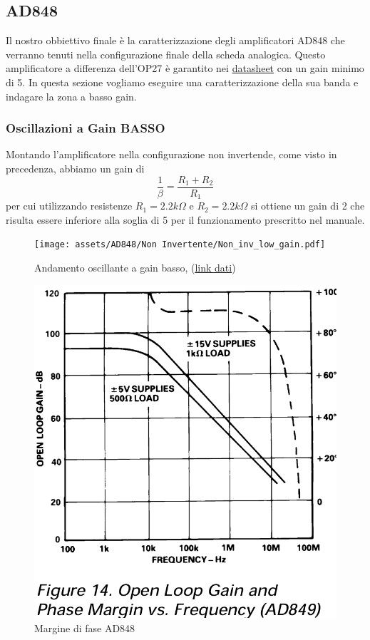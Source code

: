 \subsection{AD848}

Il nostro obbiettivo finale è la caratterizzazione degli amplificatori AD848 che verranno tenuti nella configurazione finale della scheda analogica.
Questo amplificatore a differenza dell'OP27 è garantito nei \href{https://www.analog.com/media/en/technical-documentation/data-sheets/AD848.pdf}{datasheet} con un gain minimo di 5. In questa sezione vogliamo eseguire una caratterizzazione della sua banda e indagare la zona a basso gain.

\subsubsection{Oscillazioni a Gain BASSO}

Montando l'amplificatore nella configurazione non invertende, come visto in precedenza, abbiamo un gain di $$\frac{1}{\beta} = \frac{R_1+R_2}{R_1}$$ per cui utilizzando resistenze $R_1 = 2.2k\Omega$ e $R_2 = 2.2k\Omega$ si ottiene un gain di 2 che risulta essere inferiore alla soglia di 5 per il funzionamento prescritto nel manuale.

\begin{figure}[!h]
    \begin{minipage}{.5\linewidth}
        \centering
        \texttt{[image: assets/AD848/Non Invertente/Non\_inv\_low\_gain.pdf]}
        \caption{Andamento oscillante a gain basso, (\href{https://github.com/Yedi278/Esperimentazioni-Elettronica/tree/main/-\%20OPAMP/AD848/Non-Invertente/R1\%202.2k\%20R2\%202.2k}{link dati})}
    \end{minipage}
    \begin{minipage}{0.5\linewidth}
        \centering
        \includegraphics[width=.6\linewidth]{assets/AD848/AD848_PhaseMargin.png}
        \caption{Margine di fase AD848}
    \end{minipage}
\end{figure}

